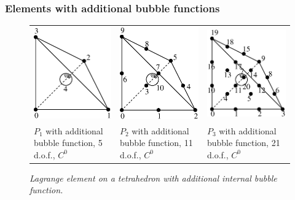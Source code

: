 \documentclass[10pt,a4paper]{article}
\begin{document}
\subsubsection{Elements with additional bubble functions}
\begin{figure}[H]
  \begin{center}
    \begin{tabular}{m{5cm}m{5cm}m{5cm}}
      \includegraphics[width=4.5cm,angle=0]{getfemlist_tetrahedron_P1_bubble.eps} & \includegraphics[width=4.5cm,angle=0]{getfemlist_tetrahedron_P2_bubble.eps} & \includegraphics[width=4.5cm,angle=0]{getfemlist_tetrahedron_P3_bubble.eps}  \\
      $P_1$ with additional bubble function, 5 d.o.f., $C^0$ & $P_2$ with additional bubble function, 11 d.o.f., $C^0$ & $P_3$ with additional bubble function, 21 d.o.f., $C^0$
    \end{tabular}
  \end{center}
  \caption{ \it Lagrange element on a tetrahedron with additional internal bubble function.} 
  \label{fig:tetrahedron_p1_bubble}
\end{figure}
\end{document}
